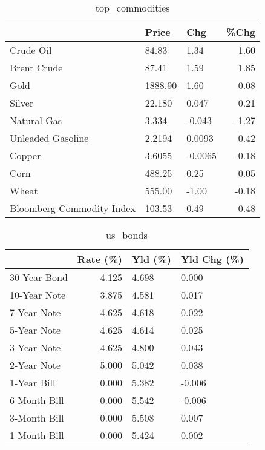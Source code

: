 \documentclass{article}%
\begin{document}
\begin{table}[htbp]%
\caption{top\_commodities}%
\centering%
\begin{adjustbox}{width=1\textwidth}%
\begin{tabular}{lllr}
\toprule
                          &   Price &     Chg &  \%Chg \\
\midrule
               Crude Oil  &   84.83 &    1.34 &  1.60 \\
             Brent Crude  &   87.41 &    1.59 &  1.85 \\
                    Gold  & 1888.90 &    1.60 &  0.08 \\
                  Silver  &  22.180 &   0.047 &  0.21 \\
             Natural Gas  &   3.334 &  -0.043 & -1.27 \\
       Unleaded Gasoline  &  2.2194 &  0.0093 &  0.42 \\
                  Copper  &  3.6055 & -0.0065 & -0.18 \\
                    Corn  &  488.25 &    0.25 &  0.05 \\
                   Wheat  &  555.00 &   -1.00 & -0.18 \\
Bloomberg Commodity Index &  103.53 &    0.49 &  0.48 \\
\bottomrule
\end{tabular}
%
\end{adjustbox}%
\end{table}

%


\begin{table}[htbp]%
\caption{us\_bonds}%
\centering%
\begin{adjustbox}{width=1\textwidth}%
\begin{tabular}{lrll}
\toprule
             &  Rate (\%) & Yld (\%) & Yld Chg (\%) \\
\midrule
30-Year Bond &     4.125 &   4.698 &       0.000 \\
10-Year Note &     3.875 &   4.581 &       0.017 \\
 7-Year Note &     4.625 &   4.618 &       0.022 \\
 5-Year Note &     4.625 &   4.614 &       0.025 \\
 3-Year Note &     4.625 &   4.800 &       0.043 \\
 2-Year Note &     5.000 &   5.042 &       0.038 \\
 1-Year Bill &     0.000 &   5.382 &      -0.006 \\
6-Month Bill &     0.000 &   5.542 &      -0.006 \\
3-Month Bill &     0.000 &   5.508 &       0.007 \\
1-Month Bill &     0.000 &   5.424 &       0.002 \\
\bottomrule
\end{tabular}
%
\end{adjustbox}%
\end{table}
\end{document}
